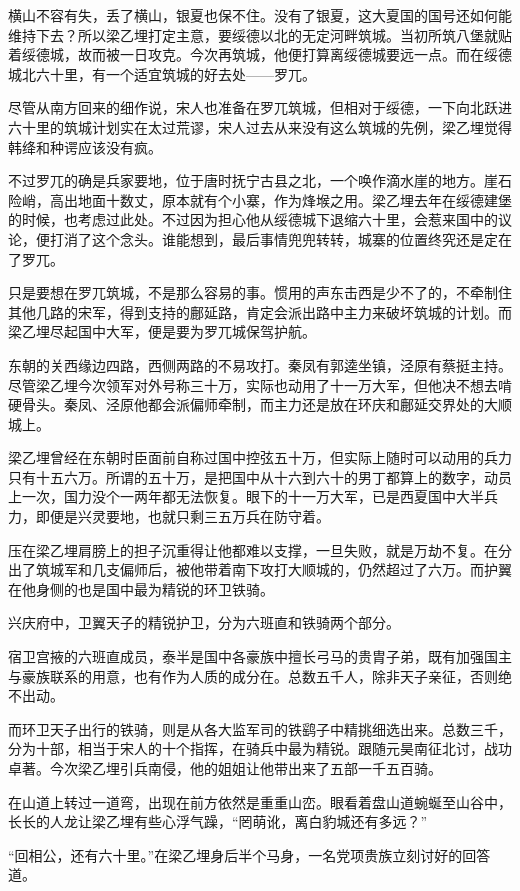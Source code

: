 横山不容有失，丢了横山，银夏也保不住。没有了银夏，这大夏国的国号还如何能维持下去？所以梁乙埋打定主意，要绥德以北的无定河畔筑城。当初所筑八堡就贴着绥德城，故而被一日攻克。今次再筑城，他便打算离绥德城要远一点。而在绥德城北六十里，有一个适宜筑城的好去处——罗兀。

尽管从南方回来的细作说，宋人也准备在罗兀筑城，但相对于绥德，一下向北跃进六十里的筑城计划实在太过荒谬，宋人过去从来没有这么筑城的先例，梁乙埋觉得韩绛和种谔应该没有疯。

不过罗兀的确是兵家要地，位于唐时抚宁古县之北，一个唤作滴水崖的地方。崖石险峭，高出地面十数丈，原本就有个小寨，作为烽堠之用。梁乙埋去年在绥德建堡的时候，也考虑过此处。不过因为担心他从绥德城下退缩六十里，会惹来国中的议论，便打消了这个念头。谁能想到，最后事情兜兜转转，城寨的位置终究还是定在了罗兀。

只是要想在罗兀筑城，不是那么容易的事。惯用的声东击西是少不了的，不牵制住其他几路的宋军，得到支持的鄜延路，肯定会派出路中主力来破坏筑城的计划。而梁乙埋尽起国中大军，便是要为罗兀城保驾护航。

东朝的关西缘边四路，西侧两路的不易攻打。秦凤有郭逵坐镇，泾原有蔡挺主持。尽管梁乙埋今次领军对外号称三十万，实际也动用了十一万大军，但他决不想去啃硬骨头。秦凤、泾原他都会派偏师牵制，而主力还是放在环庆和鄜延交界处的大顺城上。

梁乙埋曾经在东朝时臣面前自称过国中控弦五十万，但实际上随时可以动用的兵力只有十五六万。所谓的五十万，是把国中从十六到六十的男丁都算上的数字，动员上一次，国力没个一两年都无法恢复。眼下的十一万大军，已是西夏国中大半兵力，即便是兴灵要地，也就只剩三五万兵在防守着。

压在梁乙埋肩膀上的担子沉重得让他都难以支撑，一旦失败，就是万劫不复。在分出了筑城军和几支偏师后，被他带着南下攻打大顺城的，仍然超过了六万。而护翼在他身侧的也是国中最为精锐的环卫铁骑。

兴庆府中，卫翼天子的精锐护卫，分为六班直和铁骑两个部分。

宿卫宫掖的六班直成员，泰半是国中各豪族中擅长弓马的贵胄子弟，既有加强国主与豪族联系的用意，也有作为人质的成分在。总数五千人，除非天子亲征，否则绝不出动。

而环卫天子出行的铁骑，则是从各大监军司的铁鹞子中精挑细选出来。总数三千，分为十部，相当于宋人的十个指挥，在骑兵中最为精锐。跟随元昊南征北讨，战功卓著。今次梁乙埋引兵南侵，他的姐姐让他带出来了五部一千五百骑。

在山道上转过一道弯，出现在前方依然是重重山峦。眼看着盘山道蜿蜒至山谷中，长长的人龙让梁乙埋有些心浮气躁，“罔萌讹，离白豹城还有多远？”

“回相公，还有六十里。”在梁乙埋身后半个马身，一名党项贵族立刻讨好的回答道。

